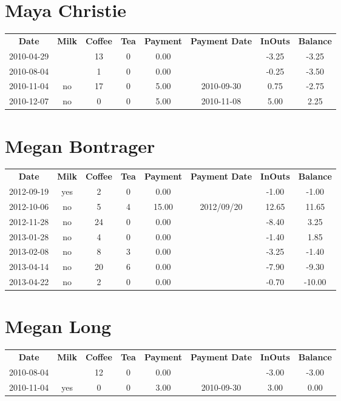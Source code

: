 \section{Maya Christie}

\begin{center}
\begin{tabular}{cccccccc}
\textbf{Date} & \textbf{Milk} & \textbf{Coffee} & \textbf{Tea} & \textbf{Payment} & \textbf{Payment Date} & \textbf{InOuts} & \textbf{Balance} \\
2010-04-29 &  & 13 & 0 & 0.00 &  & -3.25 & -3.25\\ 
2010-08-04 &  &  1 & 0 & 0.00 &  & -0.25 & -3.50\\ 
2010-11-04 & no & 17 & 0 & 5.00 & 2010-09-30 &  0.75 & -2.75\\ 
2010-12-07 & no &  0 & 0 & 5.00 & 2010-11-08 &  5.00 &  2.25
\end{tabular}
\end{center}

\section{Megan Bontrager}

\begin{center}
\begin{tabular}{cccccccc}
\textbf{Date} & \textbf{Milk} & \textbf{Coffee} & \textbf{Tea} & \textbf{Payment} & \textbf{Payment Date} & \textbf{InOuts} & \textbf{Balance} \\
2012-09-19 & yes &  2 & 0 &  0.00 &  & -1.00 &  -1.00\\ 
2012-10-06 & no &  5 & 4 & 15.00 & 2012/09/20 & 12.65 &  11.65\\ 
2012-11-28 & no & 24 & 0 &  0.00 &  & -8.40 &   3.25\\ 
2013-01-28 & no &  4 & 0 &  0.00 &  & -1.40 &   1.85\\ 
2013-02-08 & no &  8 & 3 &  0.00 &  & -3.25 &  -1.40\\ 
2013-04-14 & no & 20 & 6 &  0.00 &  & -7.90 &  -9.30\\ 
2013-04-22 & no &  2 & 0 &  0.00 &  & -0.70 & -10.00
\end{tabular}
\end{center}

\section{Megan Long}

\begin{center}
\begin{tabular}{cccccccc}
\textbf{Date} & \textbf{Milk} & \textbf{Coffee} & \textbf{Tea} & \textbf{Payment} & \textbf{Payment Date} & \textbf{InOuts} & \textbf{Balance} \\
2010-08-04 &  & 12 & 0 & 0.00 &  & -3.00 & -3.00\\ 
2010-11-04 & yes &  0 & 0 & 3.00 & 2010-09-30 &  3.00 &  0.00
\end{tabular}
\end{center}

